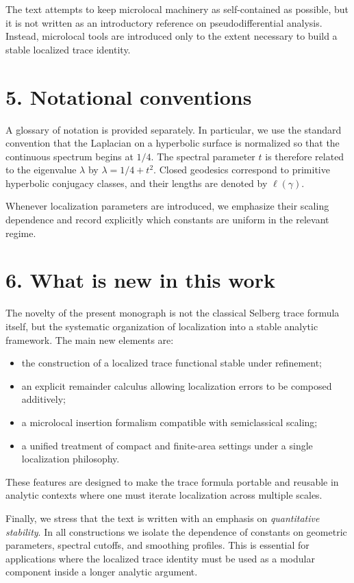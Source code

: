 \medskip

\noindent
The text attempts to keep microlocal machinery as self-contained as possible, but it is not written as an introductory reference on pseudodifferential analysis.
Instead, microlocal tools are introduced only to the extent necessary to build a stable localized trace identity.

\section*{5. Notational conventions}

\noindent
A glossary of notation is provided separately.
In particular, we use the standard convention that the Laplacian on a hyperbolic surface is normalized so that the continuous spectrum begins at $1/4$.
The spectral parameter $t$ is therefore related to the eigenvalue $\lambda$ by $\lambda = 1/4 + t^2$.
Closed geodesics correspond to primitive hyperbolic conjugacy classes, and their lengths are denoted by $\ell(\gamma)$.

\medskip

\noindent
Whenever localization parameters are introduced, we emphasize their scaling dependence and record explicitly which constants are uniform in the relevant regime.

\section*{6. What is new in this work}

\noindent
The novelty of the present monograph is not the classical Selberg trace formula itself, but the systematic organization of localization into a stable analytic framework.
The main new elements are:
\begin{itemize}
  \item the construction of a localized trace functional stable under refinement;
  \item an explicit remainder calculus allowing localization errors to be composed additively;
  \item a microlocal insertion formalism compatible with semiclassical scaling;
  \item a unified treatment of compact and finite-area settings under a single localization philosophy.
\end{itemize}
These features are designed to make the trace formula portable and reusable in analytic contexts where one must iterate localization across multiple scales.

\medskip

\noindent
Finally, we stress that the text is written with an emphasis on \emph{quantitative stability}.
In all constructions we isolate the dependence of constants on geometric parameters, spectral cutoffs, and smoothing profiles.
This is essential for applications where the localized trace identity must be used as a modular component inside a longer analytic argument.

